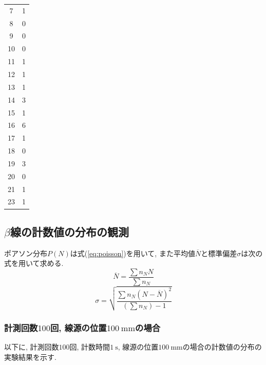 \documentclass{jarticle}
\begin{document}
\begin{table}[H]
\begin{minipage}[t]{0.45\textwidth}
\begin{tabular}{cc}
      \hline
      7 & 1 \\
      8 & 0 \\
      9 & 0 \\
      10 & 0 \\
      11 & 1 \\
      12 & 1 \\
      13 & 1 \\
      14 & 3 \\
      15 & 1 \\
      16 & 6 \\
      17 & 1 \\
      18 & 0 \\
      19 & 3 \\
      20 & 0 \\
      21 & 1 \\
      23 & 1 \\
      \hline
    \end{tabular}
  \end{minipage}
\end{table}


\subsection{$\beta$線の計数値の分布の観測}

ポアソン分布$P(N)$は式(\ref{eq:poisson})を用いて, また平均値$\overline{N}$と標準偏差$\sigma$は次の式を用いて求める.
\begin{equation}
  \overline{N} = \frac{\sum n_N N}{\sum n_N}
\end{equation}
\begin{equation}
  \sigma = \sqrt{\frac{\sum n_N (N-\overline{N})^2}{(\sum n_N) - 1}}
\end{equation}


\subsubsection{計測回数$100$回, 線源の位置$100\ \mathrm{mm}$の場合}

以下に, 計測回数$100$回, 計数時間$1\ \mathrm{s}$, 線源の位置$100\ \mathrm{mm}$の場合の計数値の分布の実験結果を示す.
\end{document}
